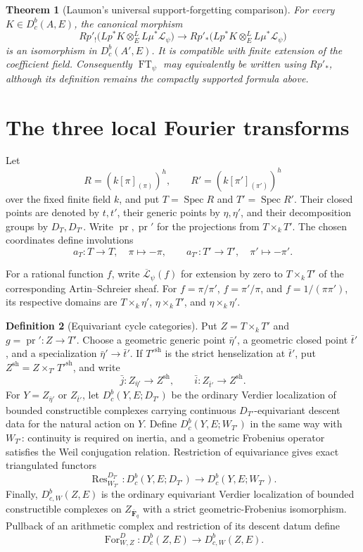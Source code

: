 \documentclass[10pt]{article}
\newtheorem{theorem}{Theorem}[section]
\theoremstyle{definition}
\newtheorem{definition}[theorem]{Definition}
\newcommand{\Fbar}{\overline{\mathbf F}_q}
\newcommand{\Dbc}{D^b_c}
\newcommand{\DbcW}{D^b_{c,W}}
\newcommand{\FT}{\operatorname{FT}}
\begin{document}
\begin{theorem}[Laumon's universal support-forgetting comparison]
For every \(K\in D^b_c(A,E)\), the canonical morphism
\[
 Rp'_!\bigl(Lp^*K\otimes_E^L L\mu^*\mathcal L_\psi\bigr)
 \longrightarrow
 Rp'_*\bigl(Lp^*K\otimes_E^L L\mu^*\mathcal L_\psi\bigr)
\]
is an isomorphism in \(D^b_c(A',E)\).  It is compatible with finite
extension of the coefficient field.  Consequently \(\FT_\psi\) may
equivalently be written
using \(Rp'_*\), although its definition remains the compactly supported
formula above.
\end{theorem}

\section{The three local Fourier transforms}

Let
\[
 R=(k[\pi]_{(\pi)})^h,\qquad
 R'=(k[\pi']_{(\pi')})^h
\]
over the fixed finite field \(k\), and put
\(T=\operatorname{Spec}R\) and \(T'=\operatorname{Spec}R'\).  Their closed
points are denoted by \(t,t'\), their generic points by \(\eta,\eta'\), and
their decomposition groups by \(D_T,D_{T'}\).  Write
\(\operatorname{pr},\operatorname{pr}'\) for the projections from
\(T\times_kT'\).  The chosen coordinates define involutions
\[
 a_T:T\longrightarrow T,\quad \pi\longmapsto-\pi,
 \qquad
 a_{T'}:T'\longrightarrow T',\quad \pi'\longmapsto-\pi'.
\]

For a rational function \(f\), write
\(\overline{\mathcal L}_\psi(f)\) for extension by zero to
\(T\times_kT'\) of the corresponding Artin--Schreier sheaf.  For
\(f=\pi/\pi'\), \(f=\pi'/\pi\), and \(f=1/(\pi\pi')\), its respective
domains are \(T\times_k\eta'\), \(\eta\times_kT'\), and
\(\eta\times_k\eta'\).

\begin{definition}[Equivariant cycle categories]
Put \(Z=T\times_kT'\) and \(g=\operatorname{pr}':Z\to T'\).  Choose a
geometric generic point \(\bar\eta'\), a geometric closed point
\(\bar t'\), and a specialization \(\bar\eta'\to\bar t'\).  If
\(T'^{\mathrm{sh}}\) is the strict henselization at \(\bar t'\), put
\(Z^{\mathrm{sh}}=Z\times_{T'}T'^{\mathrm{sh}}\), and write
\[
 \bar j:Z_{\bar\eta'}\longrightarrow Z^{\mathrm{sh}},\qquad
 \bar i:Z_{\bar t'}\longrightarrow Z^{\mathrm{sh}}.
\]
For \(Y=Z_{\bar\eta'}\) or \(Z_{\bar t'}\), let
\(\Dbc(Y,E;D_{T'})\) be the ordinary Verdier localization of bounded
constructible complexes carrying continuous \(D_{T'}\)-equivariant
descent data for the natural action on \(Y\).  Define
\(\Dbc(Y,E;W_{T'})\) in the same way with \(W_{T'}\): continuity is
required on inertia, and a geometric Frobenius operator satisfies the Weil
conjugation relation.  Restriction of equivariance gives exact
triangulated functors
\[
 \operatorname{Res}^{D_{T'}}_{W_{T'}}:
 \Dbc(Y,E;D_{T'})\longrightarrow\Dbc(Y,E;W_{T'}).
\]
Finally, \(\DbcW(Z,E)\) is the ordinary equivariant Verdier localization
of bounded constructible complexes on \(Z_{\Fbar}\) with a strict
geometric-Frobenius isomorphism.  Pullback of an arithmetic complex and
restriction of its descent datum define
\[
 \operatorname{For}^{D}_{W,Z}:\Dbc(Z,E)\longrightarrow\DbcW(Z,E).
\]
\end{definition}
\end{document}
